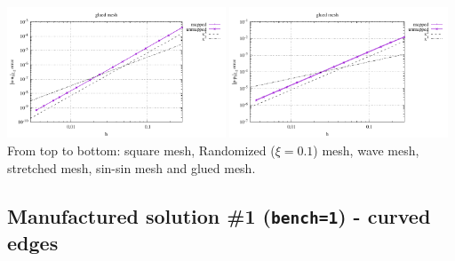 \begin{center}
\includegraphics[width=6.5cm]{python_codes/fieldstone_76/results/bench1/straight/errors_V_mt6.pdf}
\includegraphics[width=6.5cm]{python_codes/fieldstone_76/results/bench1/straight/errors_P_mt6.pdf}\\
{\captionfont From top to bottom: square mesh, Randomized ($\xi=0.1$) mesh,
wave mesh, stretched mesh, sin-sin mesh and glued mesh.}
\end{center}

\newpage
\subsection*{Manufactured solution \#1 ({\tt bench=1}) - curved edges}

